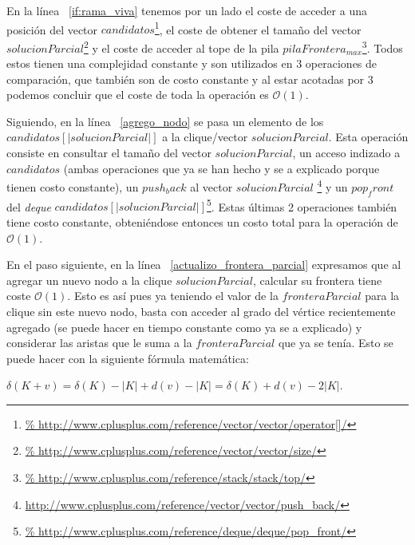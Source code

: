 \par En la l\'inea ~\ref{if:rama_viva} tenemos por un lado el coste de acceder
    a una posici\'on del vector $candidatos$\footnote{\url{%
    http://www.cplusplus.com/reference/vector/vector/operator[]/}}, el coste
    de obtener el tama\~no del vector $solucionParcial$\footnote{\url{%
    http://www.cplusplus.com/reference/vector/vector/size/}} y el coste
    de acceder al tope de la pila $pilaFrontera_{max}$\footnote{\url{%
    http://www.cplusplus.com/reference/stack/stack/top/}}. Todos estos
    tienen una complejidad constante y son utilizados en 3 operaciones de comparaci\'on,
    que tambi\'en son de costo constante y al estar acotadas por 3 podemos concluir
    que el coste de toda la operaci\'on es $\mathcal O(1)$.

\par Siguiendo, en la l\'inea ~\ref{agrego_nodo} se pasa un elemento de los $candidatos[|solucionParcial|]$
    a la clique/vector $solucionParcial$. Esta operaci\'on consiste
    en consultar el tama\~no del vector $solucionParcial$, un acceso
    indizado a $candidatos$ (ambas operaciones que ya se han hecho y se a explicado
    porque tienen costo constante), un $push_back$ al vector $solucionParcial$
    \footnote{\url{http://www.cplusplus.com/reference/vector/vector/push_back/}} y
    un $pop_front$ del \emph{deque} $candidatos[|solucionParcial|]$\footnote{\url{%
    http://www.cplusplus.com/reference/deque/deque/pop_front/}}. Estas \'ultimas
    2 operaciones tambi\'en tiene costo constante, obteni\'endose entonces
    un costo total para la operaci\'on de $\mathcal O(1)$.

\par En el paso siguiente, en la l\'inea ~\ref{actualizo_frontera_parcial}
    expresamos que al agregar un nuevo nodo a la clique $solucionParcial$,
    calcular su frontera tiene coste $\mathcal O(1)$. Esto es as\'i pues
    ya teniendo el valor de la $fronteraParcial$ para la clique sin este
    nuevo nodo, basta con acceder al grado del v\'ertice recientemente
    agregado (se puede hacer en tiempo constante como ya se a explicado)
    y considerar las aristas que le suma a la $fronteraParcial$ que ya
    se ten\'ia. Esto se puede hacer con la siguiente f\'ormula matem\'atica:

\bigskip

\par $\delta(K+v) = \delta(K) - |K| + d(v) - |K| = \delta(K) + d(v) - 2|K|$.

\bigskip

